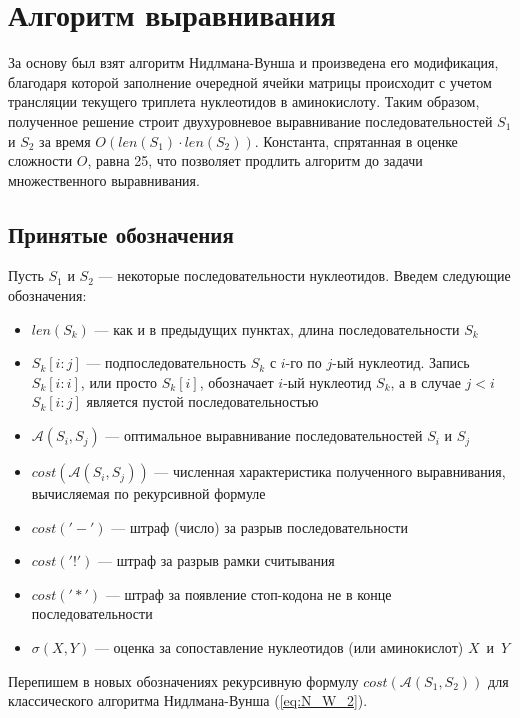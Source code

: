 \newpage

\section[Алгоритм выравнивания]{\large \centering Алгоритм выравнивания}
\hspace{\parindent} За основу был взят алгоритм Нидлмана-Вунша и произведена его модификация, благодаря которой заполнение очередной ячейки матрицы происходит с учетом трансляции текущего триплета нуклеотидов в аминокислоту. Таким образом, полученное решение строит двухуровневое выравнивание последовательностей $S_1$ и $S_2$ за время $O(len(S_1)\cdot len(S_2))$. Константа, спрятанная в оценке сложности $O$, равна 25, что позволяет продлить алгоритм до задачи множественного выравнивания.

\subsection[Принятые обозначения]{\large Принятые обозначения}
\hspace{\parindent} Пусть $S_1$ и $S_2$ --- некоторые последовательности нуклеотидов. Введем следующие обозначения:
\begin{itemize}
	\item $len(S_k)$ --- как и в предыдущих пунктах, длина последовательности $S_k$
	\item $S_k[i:j]$ --- подпоследовательность $S_k$ с $i$-го по $j$-ый нуклеотид. Запись $S_k[i:i]$, или просто $S_k[i]$, обозначает $i$-ый нуклеотид $S_k$, а в случае $j < i$ $S_k[i:j]$ является пустой последовательностью
	\item $\mathcal{A}(S_i, S_j)$ --- оптимальное выравнивание последовательностей $S_i$ и $S_j$
	\item $cost(\mathcal{A}(S_i, S_j))$ --- численная характеристика полученного выравнивания, вычисляемая по рекурсивной формуле
	\item $cost('-')$ --- штраф (число) за разрыв последовательности
	\item $cost('!')$ --- штраф за разрыв рамки считывания
	\item $cost('*')$ --- штраф за появление стоп-кодона не в конце последовательности
	\item $\sigma(X, Y)$ --- оценка за сопоставление нуклеотидов (или аминокислот) $X$~и~$Y$
\end{itemize}

\indent Перепишем в новых обозначениях рекурсивную формулу $cost(\mathcal{A}(S_1, S_2))$ для классического алгоритма Нидлмана-Вунша (\ref{eq:N_W_2}).

